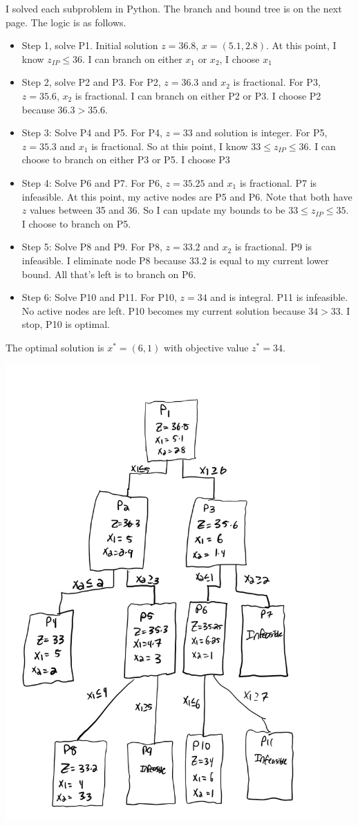 \documentclass[11pt]{article}
\theoremstyle{definition}
\newcommand{\blu}{\color{blue}}
\begin{document}
{\blu
I solved each subproblem in Python. The branch and bound tree is on the next page. The logic is as follows.

\begin{itemize}
\item Step 1, solve P1. Initial solution $z = 36.8$, $x = (5.1,2.8)$. At this point, I know $z_{IP} \leq 36$. I can branch on either $x_1$ or $x_2$, I choose $x_1$
\item Step 2, solve P2 and P3. For P2, $z = 36.3$ and $x_2$ is fractional. For P3, $z = 35.6$, $x_2$ is fractional. I can branch on either P2 or P3. I choose P2 because $36.3 > 35.6$.
\item Step 3: Solve P4 and P5. For P4, $z = 33$ and solution is integer. For P5, $ z = 35.3$ and $x_1$ is fractional. So at this point, I know $33 \leq z_{IP} \leq 36$. I can choose to branch on either P3 or P5. I choose P3
\item Step 4: Solve P6 and P7. For P6, $z = 35.25$ and $x_1$ is fractional. P7 is infeasible. At this point, my active nodes are P5 and P6. Note that both have $z$ values between 35 and 36. So I can update my bounds to be $33 \leq z_{IP} \leq 35$. I choose to branch on P5.
\item Step 5: Solve P8 and P9. For P8, $z = 33.2$ and $x_2$ is fractional. P9 is infeasible. I eliminate node P8 because $33.2$ is equal to my current lower bound. All that's left is to branch on P6.
\item Step 6: Solve P10 and P11. For P10, $z = 34$ and is integral. P11 is infeasible. No active nodes are left. P10 becomes my current solution because $34 > 33$. I stop, P10 is optimal.
\end{itemize}

The optimal solution is $x^* = (6,1)$ with objective value $z^* = 34$.


\newpage
\includegraphics[width=0.9\textwidth]{Prob1-Tree.png}
}
\end{document}
